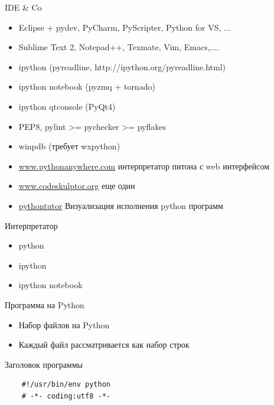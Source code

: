 \documentclass{article}
\begin{document}
\begin{center} IDE \& Co \end{center}
\begin{itemize}
    \item Eclipse + pydev, PyCharm, PyScripter, Python for VS, ...
    \item Sublime Text 2, Notepad++, Texmate, Vim, Emacs,....
    \item ipython (pyreadline, http://ipython.org/pyreadline.html)
    \item ipython notebook (pyzmq + tornado)
    \item ipython qtconsole (PyQt4)
    \item PEP8, pylint >= pychecker >= pyflakes
    \item winpdb (требует wxpython)
    \item \href{https://www.pythonanywhere.com/}{www.pythonanywhere.com} интерпретатор питона с web интерфейсом
    \item \href{http://www.codeskulptor.org/}{www.codeskulptor.org} еще один
    \item \href{http://www.pythontutor.com/visualize.html}{pythontutor} Визуализация исполнения python программ 
\end{itemize}
\newpage

\begin{center} Интерпретатор \end{center}
\begin{itemize}
    \item python
    \item ipython
    \item ipython notebook
\end{itemize}
\newpage

\begin{center} Программа на Python \end{center}
\begin{itemize}
    \item Набор файлов на Python
    \item Каждый файл рассматривается как набор строк
\end{itemize}
\begin{center} Заголовок программы \end{center}
\vspace{15pt}
\begin{lstlisting}
    #!/usr/bin/env python
    # -*- coding:utf8 -*-
\end{lstlisting}
\end{document}
